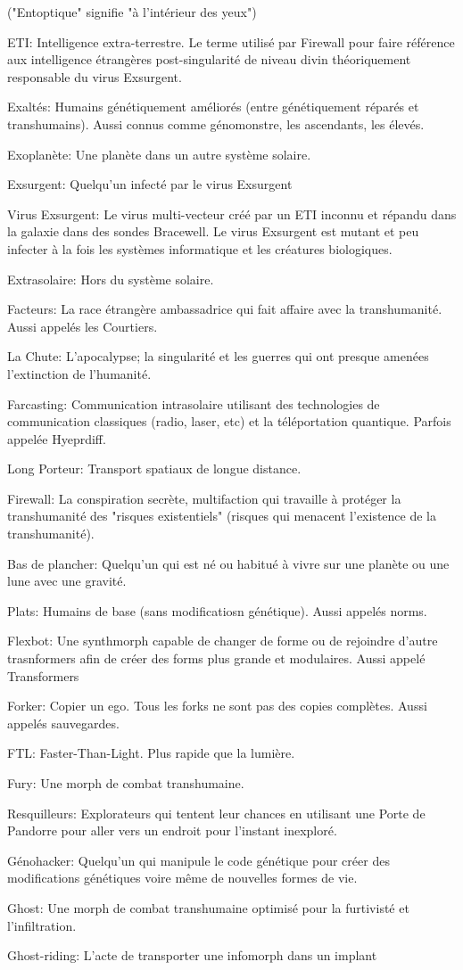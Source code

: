 ("Entoptique" signifie "à l'intérieur des yeux") \item ETI: Intelligence extra-terrestre. Le terme utilisé par Firewall pour faire référence aux intelligence étrangères post-singularité de niveau divin théoriquement responsable du virus Exsurgent. \item Exaltés: Humains génétiquement améliorés (entre génétiquement réparés et transhumains). Aussi connus comme génomonstre, les ascendants, les élevés. \item Exoplanète: Une planète dans un autre système solaire. \item Exsurgent: Quelqu'un infecté par le virus Exsurgent \item Virus Exsurgent: Le virus multi-vecteur créé par un ETI inconnu et répandu dans la galaxie dans des sondes Bracewell. Le virus Exsurgent est mutant et peu infecter à la fois les systèmes informatique et les créatures biologiques. \item Extrasolaire: Hors du système solaire. \item Facteurs: La race étrangère ambassadrice qui fait affaire avec la transhumanité. Aussi appelés les Courtiers. \item La Chute: L'apocalypse; la singularité et les guerres qui ont presque amenées l'extinction de l'humanité. \item Farcasting: Communication intrasolaire utilisant des technologies de communication classiques (radio, laser, etc) et la téléportation quantique. Parfois appelée Hyeprdiff. \item Long Porteur: Transport spatiaux de longue distance. \item Firewall: La conspiration secrète, multifaction qui travaille à protéger la transhumanité des "risques existentiels" (risques qui menacent l'existence de la transhumanité). \item Bas de plancher: Quelqu'un qui est né ou habitué à vivre sur une planète ou une lune avec une gravité. \item Plats: Humains de base (sans modificatiosn génétique). Aussi appelés norms. \item Flexbot: Une synthmorph capable de changer de forme ou de rejoindre d'autre trasnformers afin de créer des forms plus grande et modulaires. Aussi appelé Transformers \item Forker: Copier un ego. Tous les forks ne sont pas des copies complètes. Aussi appelés sauvegardes. \item FTL: Faster-Than-Light. Plus rapide que la lumière. \item Fury: Une morph de combat transhumaine. \item Resquilleurs: Explorateurs qui tentent leur chances en utilisant une Porte de Pandorre pour aller vers un endroit pour l'instant inexploré. \item Génohacker: Quelqu'un qui manipule le code génétique pour créer des modifications génétiques voire même de nouvelles formes de vie. \item Ghost: Une morph de combat transhumaine optimisé pour la furtivisté et  l'infiltration. \item Ghost-riding: L'acte de transporter une infomorph dans un implant 
